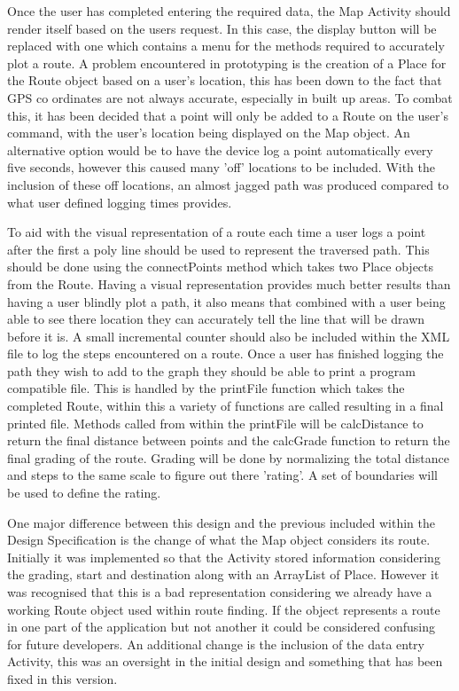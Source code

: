 Once the user has completed entering the required data, the Map Activity should render itself based on the users request. In this case, the display button will be replaced with one which contains a menu for the methods required to accurately plot a route. A problem encountered in prototyping is the creation of a Place for the Route object based on a user's location, this has been down to the fact that GPS co ordinates are not always accurate, especially in built up areas\cite{gps}. To combat this, it has been decided that a point will only be added to a Route on the user's command, with the user's location being displayed on the Map object. An alternative option would be to have the device log a point automatically every five seconds, however this caused many 'off' locations to be included. With the inclusion of these off locations, an almost jagged path was produced compared to what user defined logging times provides. 

To aid with the visual representation of a route each time a user logs a point after the first a poly line\cite{poly} should be used to represent the traversed path. This should be done using the connectPoints method which takes two Place objects from the Route. Having a visual representation provides much better results than having a user blindly plot a path, it also means that combined with a user being able to see there location they can accurately tell the line that will be drawn before it is. A small incremental counter should also be included within the XML file to log the steps encountered on a route. Once a user has finished logging the path they wish to add to the graph they should be able to print a program compatible file. This is handled by the printFile function which takes the completed Route, within this a variety of functions are called resulting in a final printed file. Methods called from within the printFile will be calcDistance to return the final distance between points and the calcGrade function to return the final grading of the route. Grading will be done by normalizing the total distance and steps to the same scale to figure out there 'rating'. A set of boundaries will be used to define the rating.

One major difference between this design and the previous included within the Design Specification is the change of what the Map object considers its route. Initially it was implemented so that the Activity stored information considering the grading, start and destination along with an ArrayList of Place. However it was recognised that this is a bad representation considering we already have a working Route object used within route finding. If the object represents a route in one part of the application but not another it could be considered confusing for future developers. An additional change is the inclusion of the data entry Activity, this was an oversight in the initial design and something that has been fixed in this version. 

